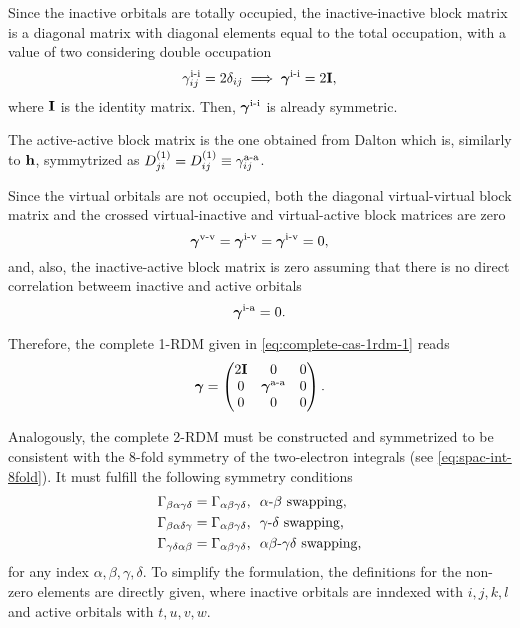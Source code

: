Since the inactive orbitals are totally occupied, the inactive-inactive block
matrix is a diagonal matrix with diagonal elements equal to the total occupation,
with a value of two considering double occupation
\begin{equation}
         \gamma_{ij}^{\text{i-i}} = 2\delta_{ij}
         \implies
         \boldsymbol{\mathrm{\gamma}}^{\text{i-i}} = 2\boldsymbol{\mathrm{I}}
         ,
\end{equation}
where $ \boldsymbol{\mathrm{I}}$ is the identity matrix.
Then, $ \boldsymbol{\mathrm{\gamma}}^{\text{i-i}}$ is already symmetric.

The active-active block matrix is the one obtained from Dalton which is,
similarly to $\boldsymbol{\mathrm{h}}$, symmytrized as 
$D^{\left( 1 \right)}_{ji} = D^{\left( 1 \right)}_{ij} \equiv \gamma_{ij}^{\text{a-a}}$.

Since the virtual orbitals are not occupied, both the diagonal virtual-virtual
block matrix and the crossed virtual-inactive and virtual-active block
matrices are zero 
\begin{equation}
    \boldsymbol{\mathrm{\gamma}}^{\text{v-v}} =
    \boldsymbol{\mathrm{\gamma}}^{\text{i-v}} =
    \boldsymbol{\mathrm{\gamma}}^{\text{i-v}} = 0
    ,
\end{equation}
and, also, the inactive-active block matrix is zero assuming that there is no
direct correlation betweem inactive and active orbitals 
\begin{equation}
    \boldsymbol{\mathrm{\gamma}}^{\text{i-a}} = 0.
\end{equation}

Therefore, the complete 1-RDM given in \cref{eq:complete-cas-1rdm-1} reads
\begin{equation} \label{eq:complete-cas-1rdm-2}
    \boldsymbol{\mathrm{\gamma}} =
    \begin{pmatrix}
        2\boldsymbol{\mathrm{I}} & 0 & 0 \\
        0 & \boldsymbol{\mathrm{\gamma}}^{\text{a-a}} & 0 \\
        0 & 0 & 0 \\
    \end{pmatrix}
    .
\end{equation}

Analogously, the complete 2-RDM must be constructed and symmetrized
to be consistent with the 8-fold symmetry of the
two-electron integrals (see \cref{eq:spac-int-8fold}).
It must fulfill the following symmetry conditions
\begin{align}
    \label{eq:sym-cond-1-2rdm}
    \Gamma_{\beta\alpha\gamma\delta} = \Gamma_{\alpha\beta\gamma\delta},\ \ & \text{$\alpha$-$\beta$ swapping,}  \\
    \label{eq:sym-cond-2-2rdm}
    \Gamma_{\beta\alpha\delta\gamma} = \Gamma_{\alpha\beta\gamma\delta},\ \ & \text{$\gamma$-$\delta$ swapping,} \\         
    \label{eq:sym-cond-3-2rdm}
    \Gamma_{\gamma\delta\alpha\beta} = \Gamma_{\alpha\beta\gamma\delta},\ \ & \text{$\alpha\beta$-$\gamma \delta$ swapping,} 
\end{align}
for any index $\alpha, \beta, \gamma, \delta$.
To simplify the formulation, the definitions for the non-zero elements are
directly given, where inactive orbitals are
inndexed with $i,j,k,l$ and active orbitals with $t,u,v,w$.

